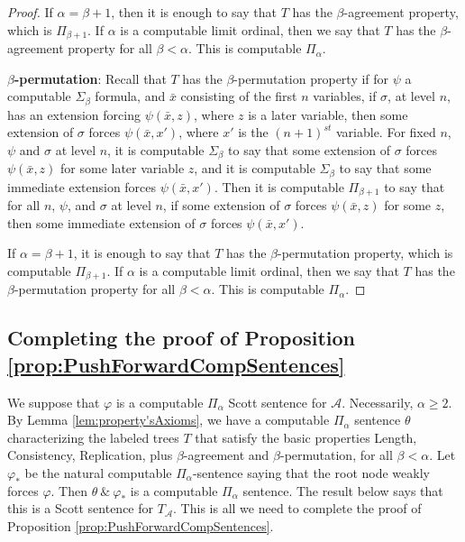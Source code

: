 \documentclass{article}
\begin{document}
\begin{proof}
\bigskip
\noindent
 If $\alpha = \beta+1$, then it is enough to say that $T$ has the $\beta$-agreement property, which is $\Pi_{\beta+1}$.  If $\alpha$ is a computable limit ordinal, then we say that $T$ has the $\beta$-agreement property for all $\beta < \alpha$.  This is computable $\Pi_\alpha$.

\bigskip
\noindent
\textbf{$\beta$-permutation}:  Recall that $T$ has the $\beta$-permutation property if for $\psi$ a computable $\Sigma_\beta$ formula, and $\bar{x}$ consisting of the first $n$ variables, if $\sigma$, at level $n$, has an extension forcing $\psi(\bar{x},z)$, where $z$ is a later variable, then some extension of $\sigma$ forces $\psi(\bar{x},x')$, where  $x'$ is the $(n+1)^{st}$ variable.  For fixed $n$, $\psi$ and $\sigma$ at level $n$, it is computable $\Sigma_\beta$ to say that some extension of $\sigma$ forces $\psi(\bar{x},z)$ for some later variable $z$, and it is computable $\Sigma_\beta$ to say that some immediate extension forces $\psi(\bar{x},x')$.  Then it is computable $\Pi_{\beta+1}$ to say that for all $n$, $\psi$, and $\sigma$ at level $n$, if some extension of $\sigma$ forces $\psi(\bar{x},z)$ for some $z$, then some immediate extension of $\sigma$ forces $\psi(\bar{x},x')$.

\bigskip
\noindent
 If $\alpha = \beta+1$, it is enough to say that $T$ has the $\beta$-permutation property, which is computable $\Pi_{\beta+1}$.  If $\alpha$ is a computable limit ordinal, then we say that $T$ has the $\beta$-permutation property for all $\beta < \alpha$.  This is computable $\Pi_\alpha$.          
\end{proof}

\subsection{Completing the proof of Proposition \ref{prop:PushForwardCompSentences}}

 We suppose that $\varphi$ is a computable $\Pi_\alpha$ Scott sentence for $\mathcal{A}$.  Necessarily, $\alpha\geq 2$.  By Lemma \ref{lem:property'sAxioms}, we have a computable $\Pi_\alpha$ sentence $\theta$ characterizing the labeled trees $T$ that satisfy the basic properties Length, Consistency, Replication, plus $\beta$-agreement and $\beta$-permutation, for all $\beta < \alpha$.  Let $\varphi_*$ be the natural computable $\Pi_\alpha$-sentence saying that the root node weakly forces $\varphi$.  Then $\theta\ \&\ \varphi_*$ is a computable $\Pi_\alpha$ sentence.  The result below says that this is a Scott sentence for $T_\mathcal{A}$.  This is all we need to complete the proof of Proposition \ref{prop:PushForwardCompSentences}.  
\end{document}
